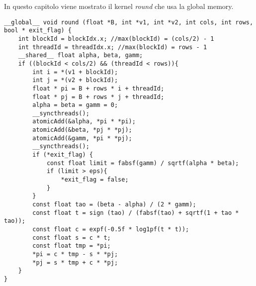 \label{sec:Global}
In questo capitolo viene mostrato il kernel \textit{round} che usa la global memory.
\begin{lstlisting}
__global__ void round (float *B, int *v1, int *v2, int cols, int rows, bool * exit_flag) {
	int blockId = blockIdx.x; //max(blockId) = (cols/2) - 1
	int threadId = threadIdx.x; //max(blockId) = rows - 1
	__shared__ float alpha, beta, gamm;
	if ((blockId < cols/2) && (threadId < rows)){
		int i = *(v1 + blockId);
		int j = *(v2 + blockId);
		float * pi = B + rows * i + threadId;
		float * pj = B + rows * j + threadId;
		alpha = beta = gamm = 0;
		__syncthreads();
		atomicAdd(&alpha, *pi * *pi);
		atomicAdd(&beta, *pj * *pj);	
		atomicAdd(&gamm, *pi * *pj);
		__syncthreads();
		if (*exit_flag) {
			const float limit = fabsf(gamm) / sqrtf(alpha * beta);
			if (limit > eps){
				*exit_flag = false;
			}
		} 
		const float tao = (beta - alpha) / (2 * gamm);
		const float t = sign (tao) / (fabsf(tao) + sqrtf(1 + tao * tao)); 
		const float c = expf(-0.5f * log1pf(t * t));
		const float s = c * t;
		const float tmp = *pi;
		*pi = c * tmp - s * *pj;
		*pj = s * tmp + c * *pj;
	}
}
\end{lstlisting}